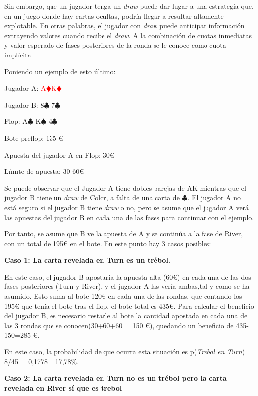 Sin embargo, que un jugador tenga un \textit{draw} puede dar lugar a una estrategia que, en un juego donde hay cartas ocultas, podría llegar a resultar altamente explotable. En otras palabras, el jugador con \textit{draw} puede anticipar información extrayendo valores cuando recibe el \textit{draw}. A la combinación de cuotas inmediatas y valor esperado de fases posteriores de la ronda se le conoce como cuota implícita. \cite{chen}

Poniendo un ejemplo de esto último:  \cite{chen}

Jugador A: \textcolor{red}{A$\vardiamondsuit$K$\vardiamondsuit$}

Jugador B: 8$\clubsuit$ 7$\clubsuit$

Flop: A$\clubsuit$ K$\spadesuit$ 4$\clubsuit$

Bote preflop: 135 €

Apuesta del jugador A en Flop: 30€

Límite de apuesta: 30-60€

Se puede observar que el Jugador A tiene dobles parejas de AK mientras que el jugador B tiene un \textit{draw} de Color, a falta de una carta de $\clubsuit$. El jugador A no está seguro si el jugador B tiene \textit{draw} o no, pero se asume que el jugador A verá las apuestas del jugador B en cada una de las fases para continuar con el ejemplo.

Por tanto, se asume que B ve la apuesta de A y se continúa a la fase de River, con un total de 195€ en el bote. En este punto hay 3 casos posibles:
\vspace{5mm} %

\textbf{Caso 1: La carta revelada en Turn es un trébol.}
\vspace{5mm} %

 En este caso, el jugador B apostaría la apuesta alta (60€) en cada una de las dos fases posteriores (Turn y River), y el jugador A las vería ambas,tal y como se ha asumido. Esto suma al bote 120€ en cada una de las rondas, que contando los 195€ que tenía el bote tras el flop, el bote total es 435€. Para calcular el beneficio del jugador B, es necesario restarle al bote la cantidad apostada en cada una de las 3 rondas que se conocen(30+60+60 = 150 €), quedando un beneficio de 435-150=285 €. 

En este caso, la probabilidad de que ocurra esta situación es 
p(\textit{Trebol en Turn}) = 8/45 = 0,1778 =17,78\%.

\vspace{5mm} %
\textbf{Caso 2: La carta revelada en Turn no es un trébol pero la carta revelada en River sí que es trebol}
\vspace{5mm} %

